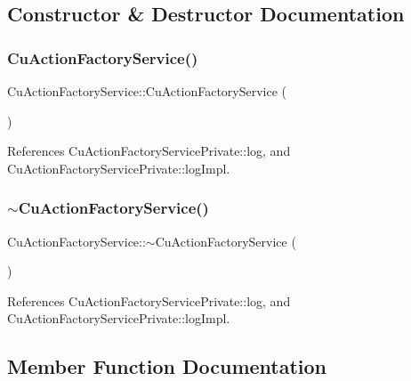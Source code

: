 \subsection{Constructor \& Destructor Documentation}
\mbox{\label{classCuActionFactoryService_a2abdf4c25df1445768d4da7c04df50dd}} 
\subsubsection{Cu\+Action\+Factory\+Service()}
{\footnotesize\ttfamily Cu\+Action\+Factory\+Service\+::\+Cu\+Action\+Factory\+Service (\begin{DoxyParamCaption}{ }\end{DoxyParamCaption})}



References Cu\+Action\+Factory\+Service\+Private\+::log, and Cu\+Action\+Factory\+Service\+Private\+::log\+Impl.

\mbox{\label{classCuActionFactoryService_a6555fc4a7ea2d07e1a9cb3080c690a54}} 
\subsubsection{$\sim$\+Cu\+Action\+Factory\+Service()}
{\footnotesize\ttfamily Cu\+Action\+Factory\+Service\+::$\sim$\+Cu\+Action\+Factory\+Service (\begin{DoxyParamCaption}{ }\end{DoxyParamCaption})\hspace{0.3cm}{\ttfamily [virtual]}}



References Cu\+Action\+Factory\+Service\+Private\+::log, and Cu\+Action\+Factory\+Service\+Private\+::log\+Impl.



\subsection{Member Function Documentation}
\mbox{\label{classCuActionFactoryService_af343d01dcdd88642a684fb091fd3701e}} 

